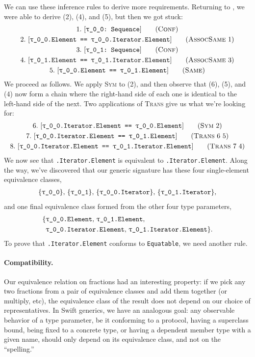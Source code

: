 \documentclass[../generics]{subfiles}
\begin{document}
\begin{example}\label{derived equiv example}
We can use these inference rules to derive more requirements. Returning to , we were able to derive (2), (4), and (5), but then we got stuck:
\begin{gather*}
\ConfStep{\rT}{Sequence}{1}\\
\AssocSameStep{1}{\rT.Element}{\rT.Iterator.Element}{2}\\
\ConfStep{\rU}{Sequence}{3}\\
\AssocSameStep{3}{\rU.Element}{\rU.Iterator.Element}{4}\\
\SameStep{\rT.Element}{\rU.Element}{5}
\end{gather*}
We proceed as follows. We apply \textsc{Sym} to (2), and then observe that (6), (5), and (4) now form a chain where the right-hand side of each one is identical to the left-hand side of the next. Two applications of \textsc{Trans} give us what we're looking for:
\begin{gather*}
\SymStep{2}{\rT.Iterator.Element}{\rT.Element}{6}\\
\TransStep{6}{5}{\rT.Iterator.Element}{\rU.Element}{7}\\
\TransStep{7}{4}{\rT.Iterator.Element}{\rU.Iterator.Element}{8}
\end{gather*}
We now see that \texttt{\rT.Iterator.Element} is equivalent to \texttt{\rU.Iterator.Element}. Along the way, we've discovered that our generic signature has these four single-element equivalence classes,
\begin{gather*}
\{\texttt{\rT}\},\,
\{\texttt{\rU}\},\,
\{\texttt{\rT.Iterator}\},\,
\{\texttt{\rU.Iterator}\},
\end{gather*}
and one final equivalence class formed from the other four type parameters,
\begin{align*}
\{&\texttt{\rT.Element},\,\texttt{\rU.Element},\,\\
&\texttt{\rT.Iterator.Element},\,\texttt{\rU.Iterator.Element}\}.
\end{align*}
To prove that \texttt{\rT.Iterator.Element} conforms to \texttt{Equatable}, we need another rule.
\end{example}

\paragraph{Compatibility.}
Our equivalence relation on fractions had an interesting property: if we pick any two fractions from a pair of equivalence classes and add them together (or multiply, etc), the equivalence class of the result does not depend on our choice of representatives. In Swift generics, we have an analogous goal: any observable behavior of a type parameter, be it conforming to a protocol, having a superclass bound, being fixed to a concrete type, or having a dependent member type with a given name, should only depend on its equivalence class, and not on the ``spelling.''
\end{document}
